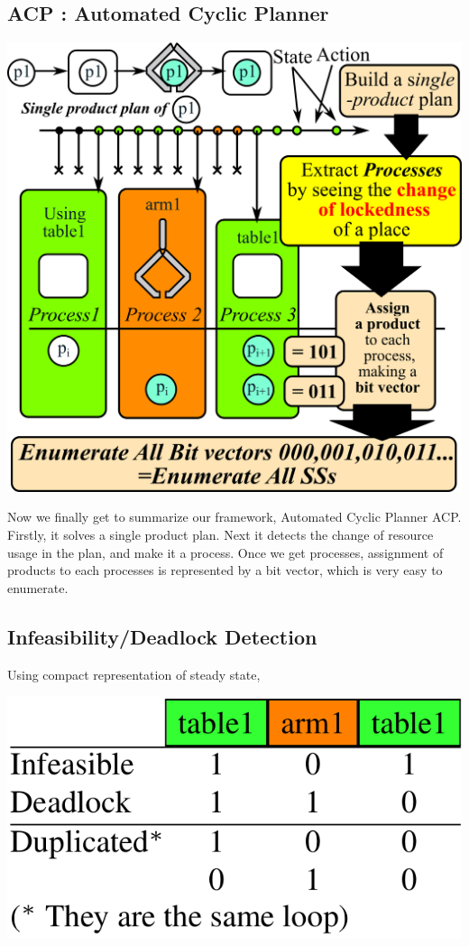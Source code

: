 \subsection{ACP : Automated Cyclic Planner}
\label{sec-7-6}
\includegraphics[height=0.8\paperheight]{img/processes.png}

\begin{resume}
Now we finally get to summarize our framework, Automated Cyclic Planner ACP.
Firstly, it solves a single product plan.
Next it detects the change of resource usage in the plan, and make it a process.
Once we get processes, assignment of products to each processes
is represented by a bit vector, which is very easy to enumerate.
\end{resume}

\subsection{Infeasibility/Deadlock Detection}
\label{sec-7-7}

Using compact representation of steady state,

\includegraphics[width=.6\textwidth]{img/static/deadlock-detection.png}


